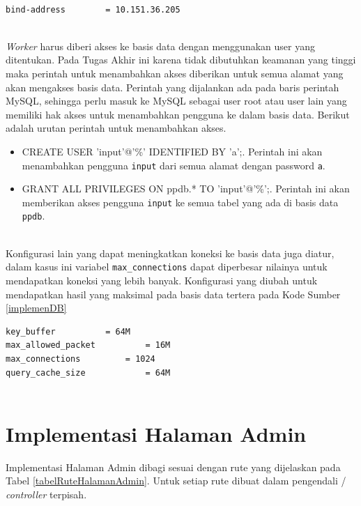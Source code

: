 \documentclass{ta-its}
\begin{document}
			\begin{lstlisting}[frame=single,tabsize=2,breaklines,caption={Konfigurasi MySQL pada Alamat IP AJK},label=alamatDB]
			
bind-address		= 10.151.36.205
			
			\end{lstlisting}
			
			\textit{Worker} harus diberi akses ke basis data dengan menggunakan user yang ditentukan. Pada Tugas Akhir ini karena tidak dibutuhkan keamanan yang tinggi maka perintah untuk menambahkan akses diberikan untuk semua alamat yang akan mengakses basis data. Perintah yang dijalankan ada pada baris perintah MySQL, sehingga perlu masuk ke MySQL sebagai user root atau user lain yang memiliki hak akses untuk menambahkan pengguna ke dalam basis data. Berikut adalah urutan perintah untuk menambahkan akses.
			
			\begin{itemize}
				\item CREATE USER 'input'@'\%' IDENTIFIED BY 'a';. Perintah ini akan menambahkan pengguna \texttt{input} dari semua alamat dengan password \texttt{a}.
				\item GRANT ALL PRIVILEGES ON ppdb.* TO 'input'@'\%';. Perintah ini akan memberikan akses pengguna \texttt{input} ke semua tabel yang ada di basis data \texttt{ppdb}.
			\end{itemize}
			\ \\
			
			Konfigurasi lain yang dapat meningkatkan koneksi ke basis data juga diatur, dalam kasus ini variabel \texttt{max\_connections} dapat diperbesar nilainya untuk mendapatkan koneksi yang lebih banyak. Konfigurasi yang diubah untuk mendapatkan hasil yang maksimal pada basis data tertera pada Kode Sumber \ref{implemenDB}
		    
		    \begin{lstlisting}[frame=single,tabsize=2,breaklines,caption={Konfigurasi MySQL untuk Server Basis Data},label=implemenDB]
key_buffer			= 64M
max_allowed_packet			= 16M
max_connections			= 1024
query_cache_size			= 64M
		    
		    \end{lstlisting}
		
		\section{Implementasi Halaman Admin}
			Implementasi Halaman Admin dibagi sesuai dengan rute yang dijelaskan pada Tabel \ref{tabelRuteHalamanAdmin}. Untuk setiap rute dibuat dalam pengendali / \textit{controller} terpisah.
			
\end{document}
